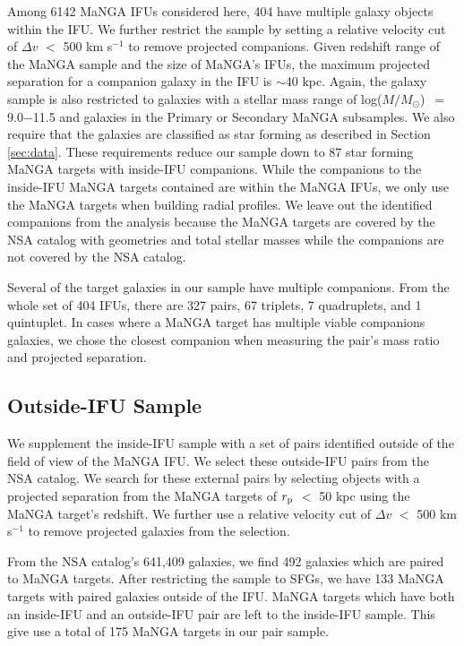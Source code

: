 \documentclass[iop,revtex4,twocolumn,apj,numberedappendix,appendixfloats]{emulateapj}
\newcommand{\logm}{log($M/M_{\odot}$)}
\begin{document}
Among 6142 MaNGA IFUs considered here, 404 have multiple galaxy objects within the IFU. We further restrict the sample by setting a relative velocity cut of $\Delta v$ $<$ 500 km s$^{-1}$ to remove projected companions. Given redshift range of the MaNGA sample and the size of MaNGA's IFUs, the maximum projected separation for a companion galaxy in the IFU is $\sim$40 kpc. Again, the galaxy sample is also restricted to galaxies with a stellar mass range of \logm\ $=$ 9.0$-$11.5 and galaxies in the Primary or Secondary MaNGA subsamples. We also require that the galaxies are classified as star forming as described in Section \ref{sec:data}. These requirements reduce our sample down to 87 star forming MaNGA targets with inside-IFU companions. While the companions to the inside-IFU MaNGA targets contained are within the MaNGA IFUs, we only use the MaNGA targets when building radial profiles. We leave out the identified companions from the analysis because the MaNGA targets are covered by the NSA catalog with geometries and total stellar masses while the companions are not covered by the NSA catalog. 

Several of the target galaxies in our sample have multiple companions. From the whole set of 404 IFUs, there are 327 pairs, 67 triplets, 7 quadruplets, and 1 quintuplet. In cases where a MaNGA target has multiple viable companions galaxies, we chose the closest companion when measuring the pair's mass ratio and projected separation. 

\subsection{Outside-IFU Sample}\label{sec:outside}

We supplement the inside-IFU sample with a set of pairs identified outside of the field of view of the MaNGA IFU. We select these outside-IFU pairs from the NSA catalog. We search for these external pairs by selecting objects with a projected separation from the MaNGA targets of $r_{\rm p}$ $<$ 50 kpc using the MaNGA target's redshift. We further use a relative velocity cut of $\Delta v$ $<$ 500 km s$^{-1}$ to remove projected galaxies from the selection. 

From the NSA catalog's 641,409 galaxies, we find 492 galaxies which are paired to MaNGA targets. After restricting the sample to SFGs, we have 133 MaNGA targets with paired galaxies outside of the IFU. MaNGA targets which have both an inside-IFU and an outside-IFU pair are left to the inside-IFU sample. This give use a total of 175 MaNGA targets in our pair sample.
\end{document}
